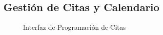 \documentclass[12pt, a4paper]{article}
\begin{document}
	\subsection{Gestión de Citas y Calendario}
	\begin{figure}[H]
		\centering
		\caption{Interfaz de Programación de Citas}
	\end{figure}
	
\end{document}
